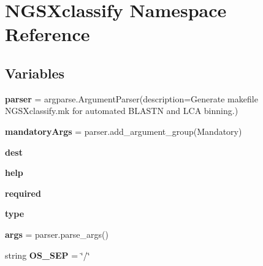 \hypertarget{namespaceNGSXclassify}{}\section{N\+G\+S\+Xclassify Namespace Reference}
\label{namespaceNGSXclassify}
\subsection*{Variables}
\begin{DoxyCompactItemize}
\item 
{\bfseries parser} = argparse.\+Argument\+Parser(description=\textquotesingle{}Generate makefile N\+G\+S\+Xclassify.\+mk for automated B\+L\+A\+S\+TN and L\+CA binning.\textquotesingle{})\hypertarget{namespaceNGSXclassify_af21964c22271fcb15b7e4ea6fddbd88f}{}\label{namespaceNGSXclassify_af21964c22271fcb15b7e4ea6fddbd88f}

\item 
{\bfseries mandatory\+Args} = parser.\+add\+\_\+argument\+\_\+group(\textquotesingle{}Mandatory\textquotesingle{})\hypertarget{namespaceNGSXclassify_a462bae903efee61daa134d2e493ad244}{}\label{namespaceNGSXclassify_a462bae903efee61daa134d2e493ad244}

\item 
{\bfseries dest}\hypertarget{namespaceNGSXclassify_a0b18f5b4c9c64f3b555233c289513029}{}\label{namespaceNGSXclassify_a0b18f5b4c9c64f3b555233c289513029}

\item 
{\bfseries help}\hypertarget{namespaceNGSXclassify_a7bc2358e2f96d1253b435ffd515f9104}{}\label{namespaceNGSXclassify_a7bc2358e2f96d1253b435ffd515f9104}

\item 
{\bfseries required}\hypertarget{namespaceNGSXclassify_acfb8f41893a9de5b87750d6c3779dccd}{}\label{namespaceNGSXclassify_acfb8f41893a9de5b87750d6c3779dccd}

\item 
{\bfseries type}\hypertarget{namespaceNGSXclassify_a5b14f804a4d67fedf6963db4e9e98022}{}\label{namespaceNGSXclassify_a5b14f804a4d67fedf6963db4e9e98022}

\item 
{\bfseries args} = parser.\+parse\+\_\+args()\hypertarget{namespaceNGSXclassify_a0bd6de3c36491a51a0f4275b0109f431}{}\label{namespaceNGSXclassify_a0bd6de3c36491a51a0f4275b0109f431}

\item 
string {\bfseries O\+S\+\_\+\+S\+EP} = \char`\"{}/\char`\"{}\hypertarget{namespaceNGSXclassify_ae122ff92987ad0d4b92caf576f9e98e5}{}\label{namespaceNGSXclassify_ae122ff92987ad0d4b92caf576f9e98e5}


\end{DoxyCompactItemize}
